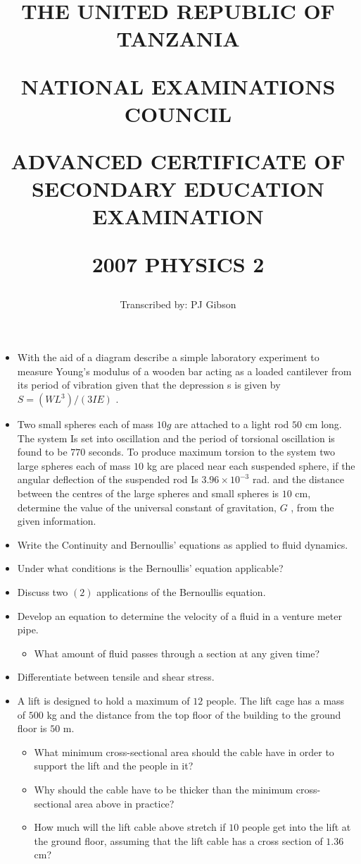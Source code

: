 \documentclass{article}
\title{THE UNITED REPUBLIC OF TANZANIA

NATIONAL EXAMINATIONS COUNCIL

ADVANCED CERTIFICATE OF SECONDARY EDUCATION EXAMINATION

\textbf{2007 PHYSICS 2}}
\author{Transcribed by:  PJ Gibson}
\begin{document}
\maketitle

\begin{itemize}
\item With the aid of a diagram describe a simple laboratory experiment to measure Young’s modulus of a wooden bar acting as a loaded cantilever from its period of vibration given that the depression s is given by $ S=(WL^{3})/(3IE)$ . 
\item Two small spheres each of mass $ 10g$ are attached to a light rod $ 50$ cm long. The system Is set into oscillation and the period of torsional oscillation is found to be $ 770$ seconds. To produce maximum torsion to the system two large spheres each of mass $ 10$ kg are placed near each suspended sphere, if the angular deflection of the suspended rod Is $ 3.96 \times 10^{-3}$ rad. and the distance between the centres of the large spheres and small spheres is $ 10$ cm, determine the value of the universal constant of gravitation, $ G$ , from the given information. 
\item Write the Continuity and Bernoullis’ equations as applied to fluid dynamics. 
\item Under what conditions is the Bernoullis’ equation applicable?
\item Discuss two $ (2)$ applications of the Bernoullis equation. 
\item Develop an equation to determine the velocity of a fluid in a venture meter pipe.
 \begin{itemize}
\item What amount of fluid passes through a section at any given time? 
\end{itemize}
\item Differentiate between tensile and shear stress. 
\item A lift is designed to hold a maximum of $ 12$ people. The lift cage has a mass of $ 500$ kg and the distance from the top floor of the building to the ground floor is $ 50$ m.
 \begin{itemize}
\item What minimum cross-sectional area should the cable have in order to support the lift and the people in it?
\item Why should the cable have to be thicker than the minimum cross-sectional area above in practice? 
\item How much will the lift cable above stretch if $ 10$ people get into the lift at the ground floor, assuming that the lift cable has a cross section of $ 1.36$ cm? 

\end{itemize}
\end{itemize}
\end{document}
